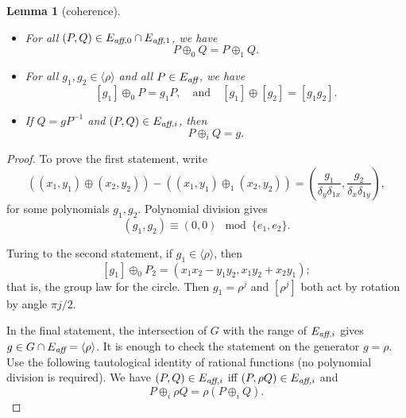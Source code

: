 \documentclass[12pt]{article}
\newtheorem{lemma}[theorem]{Lemma}
\newcommand{\op}[1]{\hbox{#1}}
\newcommand{\f}[1]{\frac{1}{#1}}
\newcommand{\Eaff}{E_{\op{\scriptsize\it aff}}}
\newcommand{\Eaf}[1]{E_{\op{\scriptsize\it aff},{#1}}}
\newcommand{\Eoo}{E^{\circ}}
\newcommand{\ang}[1]{\langle{#1}\rangle}
\def\cong{\equiv}
\begin{document}
\begin{lemma}[coherence] \label{lemma:extend} 
\par
\noindent
\begin{itemize}
\item For all $(P,Q)\in \Eaf0 \cap \Eaf1$, we have
\[
P \oplus_0 Q = P\oplus_1 Q.
\]
\item
For all $g_1,g_2\in \ang{\rho}$ and all $P\in \Eaff$, we have
\[
[g_1]\oplus_0 P = g_1 P,\quad\text{and}\quad [g_1]\oplus[g_2]=[g_1 g_2].
\]
\item If $Q = g P^{-1}$ and $(P,Q)\in \Eaf{i}$, then
\[
P\oplus_i Q = g.
\]
\end{itemize}
\end{lemma}

\begin{proof} To prove the first statement, write
\[
((x_1,y_1)\oplus (x_2,y_2)) -
((x_1,y_1)\oplus_1 (x_2,y_2) ) = 
(\frac{g_1}{\delta_y\delta_{1x}},\frac{g_2}{\delta_x\delta_{1y}}),
\]
for some polynomials $g_1,g_2$.   Polynomial division gives
\[
(g_1,g_2) \cong (0,0) \mod \{e_1,e_2\}.
\]

Turing to the second statement, if $g_1\in \ang{\rho}$, then
\[
[g_1]\oplus_0 P_2 = (x_1 x_2-y_1 y_2,x_1 y_2 + x_2 y_1);
\]
that is, the group law for the circle.  Then $g_1=\rho^j$ and $[\rho^j]$
both act by rotation by angle $\pi j/2$.

In the final statement, the intersection of $G$ with the range of
$\Eaf{i}$ gives $g\in G\cap \Eaff = \ang{\rho}$.  It is enough to
check the statement on the generator $g =\rho$.  Use the following
tautological identity of rational functions (no polynomial division is
required).  We have $(P,Q)\in \Eaf{i}$ iff $(P,\rho Q)\in \Eaf{i}$ and
\begin{equation}\label{eqn:rho-plus}
P\oplus_i \rho Q =  \rho(P\oplus_i Q).
\end{equation}
\end{proof}

\end{document}
